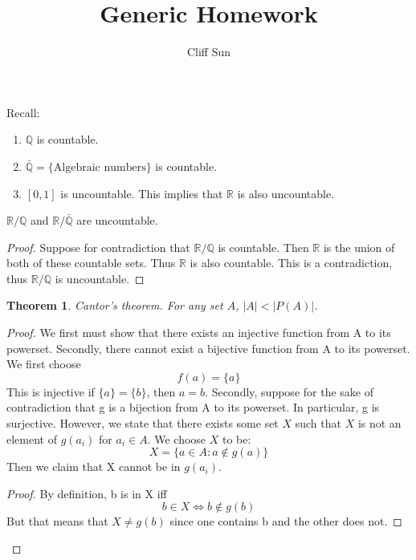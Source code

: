 \documentclass{article}
\title{Generic Homework}
\author{Cliff Sun}
\newtheorem{theorem}{Theorem}[section]
\begin{document}
\maketitle

Recall:

\begin{enumerate}
    \item $\mathbb{Q}$ is countable.
    \item $\bar{\mathbb{Q}} = \{\textrm{Algebraic numbers}\}$ is countable.
    \item $[0,1]$ is uncountable. This implies that $\mathbb{R}$ is also uncountable. 
\end{enumerate}

\begin{corollary}
    $\mathbb{R}/\mathbb{Q}$ and $\mathbb{R}/\bar{\mathbb{Q}}$ are uncountable. 
\end{corollary}

\begin{proof}
    Suppose for contradiction that $\mathbb{R}/\mathbb{Q}$ is countable. Then $\mathbb{R}$ is the union of both of these countable sets. Thus $\mathbb{R}$ is also countable. This is a contradiction, thus $\mathbb{R}/\mathbb{Q}$ is uncountable. 
\end{proof}

\begin{theorem}
    Cantor's theorem. For any set $A$, $|A| < |P(A)|$. 
\end{theorem}

\begin{proof}
    We first must show that there exists an injective function from A to its powerset. Secondly, there cannot exist a bijective function from A to its powerset. We first choose
    \begin{equation}
        f(a) = \{a\}
    \end{equation}
    This is injective if $\{a\} = \{b\}$, then $a = b$. Secondly, suppose for the sake of contradiction that g is a bijection from A to its powerset. In particular, g is surjective. However, we state that there exists some set
    $X$ such that $X$ is not an element of $g(a_i)$ for $a_i \in A$. We choose $X$ to be:
    \begin{equation}
        X = \{a \in A : a \notin g(a)\}
    \end{equation}
    Then we claim that X cannot be in $g(a_i)$. 
    \begin{proof}
        By definition, b is in X iff
        \begin{equation}
            b \in X \iff b \notin g(b)
        \end{equation}
        But that means that $X \neq g(b)$ since one contains b and the other does not. 
    \end{proof}
\end{proof}
\end{document}
